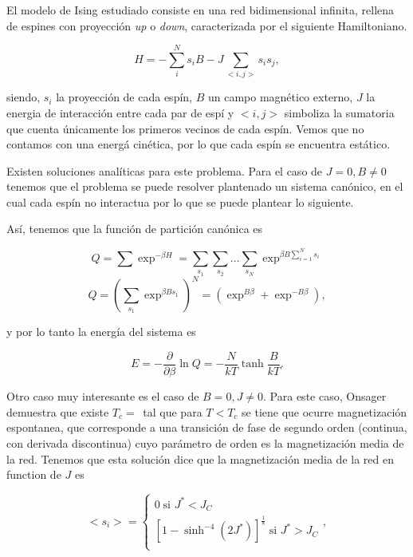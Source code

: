 \documentclass[%
 reprint,
 amsmath,amssymb,
 aps,
]{revtex4-1}
\begin{document}
El modelo de Ising estudiado consiste en una red bidimensional infinita,
rellena de espines con proyecci\'on \textit{up} o \textit{down}, caracterizada
por el siguiente Hamiltoniano.

\begin{equation}
  H = - \sum_i^N s_i B - J \sum_{<i, j>} s_i s_j,
\end{equation}

siendo, $s_i$ la proyecci\'on de cada esp\'in, $B$ un campo magn\'etico externo,
$J$ la energia de interacci\'on entre cada par de esp\'i y $<i, j>$ simboliza la
sumatoria que cuenta \'unicamente los primeros vecinos de cada esp\'in. Vemos que
no contamos con una energ\'a cin\'etica, por lo que cada esp\'in se encuentra
est\'atico.

Existen soluciones anal\'iticas para este problema. Para el caso de $J = 0, B
\neq 0$ tenemos que el problema se puede resolver plantenado un sistema
can\'onico, en el cual cada esp\'in no interactua por lo que se puede plantear
lo siguiente.

As\'i, tenemos que la funci\'on de partici\'on can\'onica es

\begin{equation}
  Q = \sum \exp^{-\beta H} = \sum_{s_1} \sum_{s_2} ... \sum_{s_N} \exp^{\beta B \sum_{i = 1}^N s_i}
\end{equation}
\begin{equation}
  Q = (\sum_{s_1} \exp^{\beta B  s_1}) ^ N = (\exp^{B\beta} + \exp^{-B\beta}),
\end{equation}

y por lo tanto la energ\'ia del sistema es

\begin{equation}
  E = -\frac{\partial}{\partial \beta} \ln Q = -\frac{N}{kT}\tanh{\frac{B}{kT}}.
\end{equation}

Otro caso muy interesante es el caso de $B = 0, J \neq 0$. Para este caso,
Onsager\cite{Onsager} demuestra que existe $T_c = \frac{}{}$ tal que para $T <
T_c$ se tiene que ocurre magnetizaci\'on espontanea, que corresponde a una
transici\'on de fase de segundo orden (continua, con derivada discontinua) cuyo
par\'ametro de orden es la magnetizaci\'on media de la red. Tenemos que esta
soluci\'on dice que la magnetizaci\'on media de la red en function de $J$ es

\begin{equation}
  <s_i> =
  \left \{
    \begin{matrix}
      0 \; \text{si } J^* < J_C \\
      [1 - \sinh^{-4} (2J^*)]^{\frac{1}{8}} \; \text{si } J^* > J_C \\
    \end{matrix}
  \right . ,
\end{equation}
\end{document}
